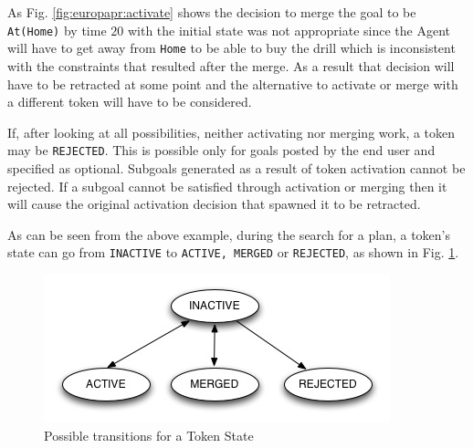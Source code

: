 \begin{description}
As Fig. \ref{fig:europapr:activate} shows the decision to merge the
goal to be \texttt{At(Home)} by time $20$ with the initial state was
not appropriate since the Agent will have to get away from
\texttt{Home} to be able to buy the drill which is inconsistent with
the constraints that resulted after the merge. As a result that
decision will have to be retracted at some point and the alternative
to activate or merge with a different token will have to be
considered.

If, after looking at all possibilities, neither activating nor merging
work, a token may be \texttt{REJECTED}. This is possible only for
goals posted by the end user and specified as optional. Subgoals
generated as a result of token activation cannot be rejected. If a
subgoal cannot be satisfied through activation or merging then it will
cause the original activation decision that spawned it to be
retracted.

As can be seen from the above example, during the search for a plan, a
token's state can go from \texttt{INACTIVE} to \texttt{ACTIVE, MERGED}
or \texttt{REJECTED}, as shown in Fig. \ref{fig:europapr:states}.

\begin{figure} \centering
  \includegraphics[scale=0.45]{figs/europa-pr-states.jpg}
  \caption{\small Possible transitions for a Token State}
\label{fig:europapr:states}
\end{figure}



\end{description}
